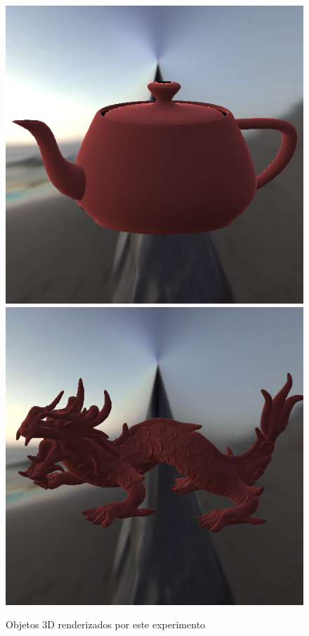 \begin{figure}[H]
    \caption{\small{Objetos 3D renderizados por este experimento}}\label{fig-minnaert-eqlang}
  \includegraphics[width=\linewidth]{./Imagens/brdfs/minnaert-teapot.png}
\endminipage\hfill
{}
  \includegraphics[width=\linewidth]{./Imagens/brdfs/minnaert-dragon.png}

\end{figure}
